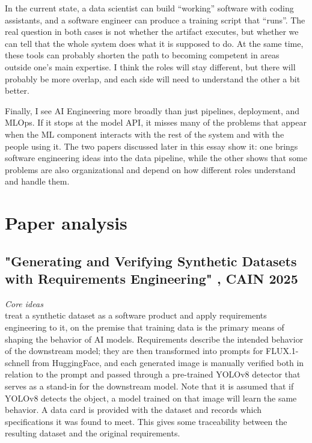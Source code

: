 \documentclass[11pt,a4paper]{article}
\newcommand{\heading}[1]{
  \vspace{.5em}
  \noindent\emph{#1}
}
\begin{document}
In the current state, a data scientist can build “working” software with coding assistants, and a software engineer can produce a training script that “runs”. The real question in both cases is not whether the artifact executes, but whether we can tell that the whole system does what it is supposed to do. At the same time, these tools can probably shorten the path to becoming competent in areas outside one's main expertise. I think the roles will stay different, but there will probably be more overlap, and each side will need to understand the other a bit better. 

Finally, I see AI Engineering more broadly than just pipelines, deployment, and MLOps. If it stops at the model API, it misses many of the problems that appear when the ML component interacts with the rest of the system and with the people using it. The two papers discussed later in this essay show it: one brings software engineering ideas into the data pipeline, while the other shows that some problems are also organizational and depend on how different roles understand and handle them.

\section{Paper analysis}

\subsection{"Generating and Verifying Synthetic Datasets with Requirements Engineering" \cite{vonderhaar2025generating}, CAIN 2025} \label{paper:sdg}

\heading{Core ideas}\\
\citet{vonderhaar2025generating} treat a synthetic dataset as a software product and apply requirements engineering to it, on the premise that training data is the primary means of shaping the behavior of AI models. Requirements describe the intended behavior of the downstream model; they are then transformed into prompts for FLUX.1-schnell from HuggingFace, and each generated image is manually verified both in relation to the prompt and passed through a pre-trained YOLOv8 detector that serves as a stand-in for the downstream model. Note that it is assumed that if YOLOv8 detects the object, a model trained on that image will learn the same behavior.
A data card is provided with the dataset and records which specifications it was found to meet. This gives some traceability between the resulting dataset and the original requirements.
\end{document}
